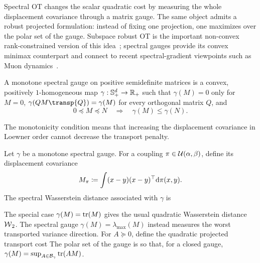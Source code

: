 Spectral OT changes the scalar quadratic cost by measuring the whole displacement covariance through a matrix gauge. The same object admits a robust projected formulation: instead of fixing one projection, one maximizes over the polar set of the gauge. Subspace robust OT is the important non-convex rank-constrained version of this idea~\cite{paty2019subspace}; spectral gauges provide its convex minimax counterpart and connect to recent spectral-gradient viewpoints such as Muon dynamics~\cite{peyre2026muon}.

\begin{defn}\label{def-monotone-spectral-gauge}
	A monotone spectral gauge on positive semidefinite matrices is a convex, positively $1$-homogeneous map $\gamma:\mathbb S_+^d\to\mathbb{R}_+$ such that $\gamma(M)=0$ only for $M=0$, $\gamma(QM\transp{Q})=\gamma(M)$ for every orthogonal matrix $Q$, and
	\[
		0\preceq M\preceq N
		\quad\Longrightarrow\quad
		\gamma(M)\leq\gamma(N).
	\]
\end{defn}
The monotonicity condition means that increasing the displacement covariance in Loewner order cannot decrease the transport penalty.

\begin{defn}\label{def-spectral-wasserstein}
	Let $\gamma$ be a monotone spectral gauge. For a coupling $\pi\in\mathcal{U}(\alpha,\beta)$, define its displacement covariance
	\[
		M_\pi\coloneqq\int (x-y)(x-y)^\top\mathrm{d}\pi(x,y).
	\]
	The spectral Wasserstein distance associated with $\gamma$ is
\end{defn}

The special case $\gamma(M)=\operatorname{tr}(M)$ gives the usual quadratic Wasserstein distance $\operatorname{\mathcal{W}}_2$. The spectral gauge $\gamma(M)=\lambda_{\max}(M)$ instead measures the worst transported variance direction. For $A\succeq0$, define the quadratic projected transport cost
The polar set of the gauge is
so that, for a closed gauge, $\gamma(M)=\sup_{A\in\mathcal B_\gamma}\operatorname{tr}(AM)$.

